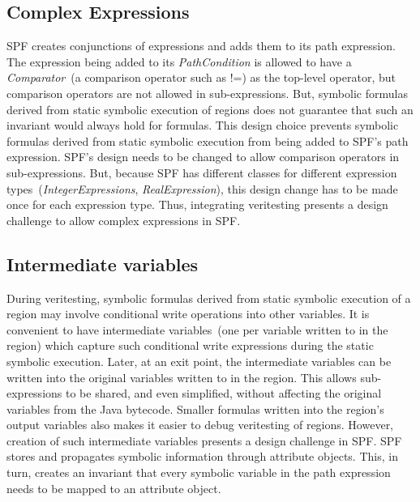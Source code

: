 \subsection{Complex Expressions}
SPF creates conjunctions of expressions and adds them to its path expression.
%
The expression being added to its \textit{PathCondition} is allowed to have a \textit{Comparator}~(a comparison operator such as !=) as the top-level operator, but comparison operators are not allowed in sub-expressions.
%
But, symbolic formulas derived from static symbolic execution of regions does not guarantee that such an invariant would always hold for formulas.
%
This design choice prevents symbolic formulas derived from static symbolic execution from being added to SPF\rq s path expression.
%
SPF\rq s design needs to be changed to allow comparison operators in sub-expressions.
%
But, because SPF has different classes for different expression types~(\textit{IntegerExpressions}, \textit{RealExpression}), this design change has to be made once for each expression type.
%
Thus, integrating veritesting presents a design challenge to allow complex expressions in SPF. 

\subsection{Intermediate variables}
%
During veritesting, symbolic formulas derived from static symbolic execution of a region may involve conditional write operations into other variables. 
%
It is convenient to have intermediate variables~(one per variable written to in the region) which capture such conditional write expressions during the static symbolic execution.
%
Later, at an exit point, the intermediate variables can be written into the original variables written to in the region.
%
This allows sub-expressions to be shared, and even simplified, without affecting the original variables from the Java bytecode.
%
Smaller formulas written into the region\rq s output variables also makes it easier to debug veritesting of regions.
%
However, creation of such intermediate variables presents a design challenge in SPF.
%
SPF stores and propagates symbolic information through attribute objects.
%
This, in turn, creates an invariant that every symbolic variable in the path expression needs to be mapped to an attribute object.
